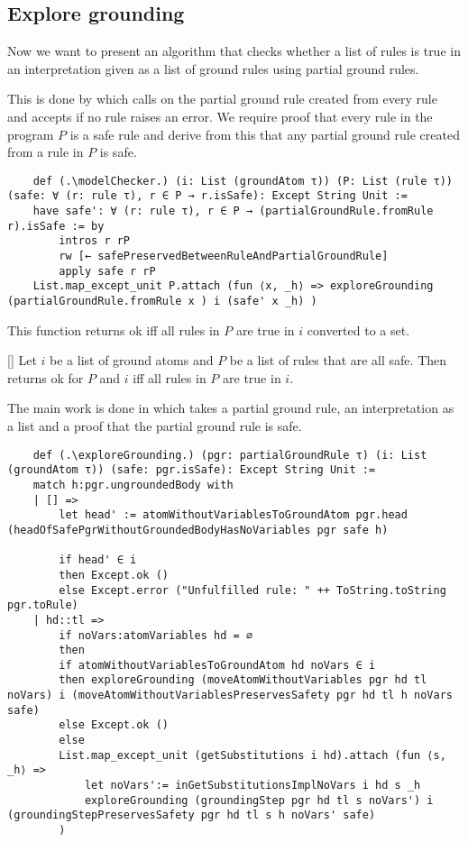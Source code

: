     \subsection{Explore grounding}

    Now we want to present an algorithm that checks whether a list of rules is true in an interpretation given as a list of ground rules using partial ground rules.
    
    This is done by \modelChecker which calls \exploreGrounding on the partial ground rule created from every rule and accepts if no rule raises an error. We require proof that every rule in the program $P$ is a safe rule and derive from this that any partial ground rule created from a rule in $P$ is safe.

    \begin{lstlisting}
    def (.\modelChecker.) (i: List (groundAtom τ)) (P: List (rule τ)) (safe: ∀ (r: rule τ), r ∈ P → r.isSafe): Except String Unit :=
    have safe': ∀ (r: rule τ), r ∈ P → (partialGroundRule.fromRule r).isSafe := by
        intros r rP
        rw [← safePreservedBetweenRuleAndPartialGroundRule]
        apply safe r rP
    List.map_except_unit P.attach (fun ⟨x, _h⟩ => exploreGrounding (partialGroundRule.fromRule x ) i (safe' x _h) )
    \end{lstlisting}
    
    This function returns ok iff all rules in $P$ are true in $i$ converted to a set.

    \begin{theorem}\label{trm:modelChecker}[\modelCheckerUnitIffAllRulesTrue]
        Let $i$ be a list of ground atoms and $P$ be a list of rules that are all safe. Then \modelChecker returns ok for $P$ and $i$ iff all rules in $P$ are true in $i$.
    \end{theorem}

    The main work is done in \exploreGrounding which takes a partial ground rule, an interpretation as a list and a proof that the partial ground rule is safe.

    \begin{lstlisting}
    def (.\exploreGrounding.) (pgr: partialGroundRule τ) (i: List (groundAtom τ)) (safe: pgr.isSafe): Except String Unit :=
    match h:pgr.ungroundedBody with
    | [] =>
        let head' := atomWithoutVariablesToGroundAtom pgr.head (headOfSafePgrWithoutGroundedBodyHasNoVariables pgr safe h)

        if head' ∈ i
        then Except.ok ()
        else Except.error ("Unfulfilled rule: " ++ ToString.toString pgr.toRule)
    | hd::tl =>
        if noVars:atomVariables hd = ∅
        then
        if atomWithoutVariablesToGroundAtom hd noVars ∈ i
        then exploreGrounding (moveAtomWithoutVariables pgr hd tl noVars) i (moveAtomWithoutVariablesPreservesSafety pgr hd tl h noVars safe)
        else Except.ok ()
        else
        List.map_except_unit (getSubstitutions i hd).attach (fun ⟨s, _h⟩ =>
            let noVars':= inGetSubstitutionsImplNoVars i hd s _h
            exploreGrounding (groundingStep pgr hd tl s noVars') i (groundingStepPreservesSafety pgr hd tl s h noVars' safe)
        )
    \end{lstlisting}

